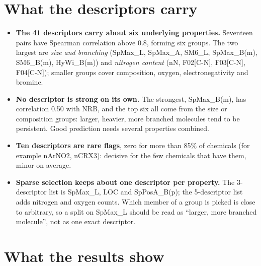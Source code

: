 \documentclass[11pt]{article}
\begin{document}
\section*{What the descriptors carry}

\begin{itemize}
  \item \textbf{The 41 descriptors carry about six underlying properties.} Seventeen pairs have
        Spearman correlation above 0.8, forming six groups. The two largest are
        \emph{size and branching} (SpMax\_L, SpMax\_A, SM6\_L, SpMax\_B(m), SM6\_B(m), HyWi\_B(m))
        and \emph{nitrogen content} (nN, F02[C-N], F03[C-N], F04[C-N]); smaller groups cover
        composition, oxygen, electronegativity and bromine.
  \item \textbf{No descriptor is strong on its own.} The strongest, SpMax\_B(m), has correlation
        0.50 with NRB, and the top six all come from the size or composition groups: larger,
        heavier, more branched molecules tend to be persistent. Good prediction needs several
        properties combined.
  \item \textbf{Ten descriptors are rare flags}, zero for more than 85\% of chemicals (for example
        nArNO2, nCRX3): decisive for the few chemicals that have them, minor on average.
  \item \textbf{Sparse selection keeps about one descriptor per property.} The 3-descriptor list is
        SpMax\_L, LOC and SpPosA\_B(p); the 5-descriptor list adds nitrogen and oxygen counts.
        Which member of a group is picked is close to arbitrary, so a split on SpMax\_L should be
        read as ``larger, more branched molecule'', not as one exact descriptor.
\end{itemize}

\section*{What the results show}
\end{document}

